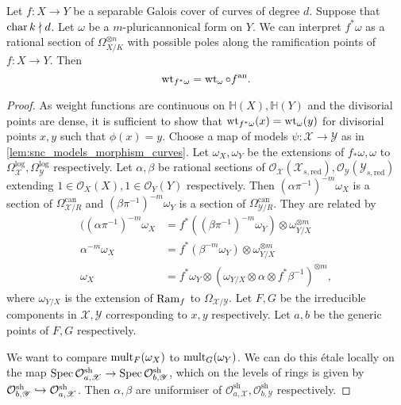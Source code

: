 \begin{theorem}\label{prop:weightfunction_fullback}
	Let $f: X \to Y$ be a separable Galois cover of curves of degree $d$. 
	Suppose that $\operatorname{char} k \nmid d$. 
	Let $\omega $ be a $m$-pluricannonical form on $Y$. 
	We can interpret $f^*\omega$ as a rational section of $\Omega_{X / K}^{\otimes n}$ with possible poles along the ramification points of $f: X \to Y$. 
	Then \[
		\operatorname{wt}_{f^*\omega} = \operatorname{wt}_{\omega} \circ f{}^{\text{an}}
	.\] 
\end{theorem}
\begin{proof}
	As weight functions are continuous on $\mathbb{H}(X), \mathbb{H}(Y)$ and the divisorial points are dense, it is sufficient to show that $\operatorname{wt}_{f^* \omega}(x) = \operatorname{wt}_{\omega}(y)$ 
	for divisorial points  $x, y$ such that $\phi(x) = y$. 
	Choose a map of models $\psi: \mathscr X \to \mathscr Y$ as in \cref{lem:snc_models_morphism_curves}.  
	Let $\omega_X, \omega_Y$ be the extensions of $f_*\omega, \omega$ to $\Omega^{\text{log}}_{\mathscr X}, \Omega^{\text{log}}_{\mathscr Y}$ respectively. 
	Let $\alpha, \beta$ be rational sections of $\mathcal{O}_{\mathscr X}(\mathscr X_{s, \text{red}}), \mathcal{O}_{\mathscr Y}(\mathscr Y_{s, \text{red}} )$ extending $1 \in \mathcal{O}_X(X), 1 \in \mathcal{O}_Y(Y)$ respectively. 
	Then $(\alpha \pi^{-1})^{-m}\omega_{X}$ is a section of $\Omega^{\text{can}}_{\mathscr X / R}$ and $(\beta\pi^{-1})^{-m} \omega_{Y}$ is a section of $\Omega^{\text{can}}_{\mathscr Y / R}$. 
	They are related by \begin{align*}
		((\alpha \pi^{-1})^{-m} \omega_X &= f^*((\beta \pi^{-1})^{-m}\omega_Y) \otimes \omega_{Y / X}^{\otimes m} \\
		\alpha ^{-m} \omega_X &= f^*(\beta ^{-m}\omega_Y) \otimes \omega_{Y / X}^{\otimes m} \\
		\omega_{X} &= f^* \omega_{Y} \otimes (\omega_{Y / X} \otimes \alpha \otimes f^*\beta ^{-1})^{\otimes m}
	,\end{align*} 
	where $\omega_{ Y /  X}$ is the extension of $\operatorname{Ram}_f$ to $\Omega_{\mathscr X / \mathscr Y}$.
	Let $F, G$ be the irreducible components in $\mathscr X, \mathscr Y$ corresponding to $x, y$ respectively. 
	Let $a, b$ be the generic points of $F, G$ respectively. 

	We want to compare $\operatorname{mult}_{F}(\omega_X)$ to $\operatorname{mult}_{G}(\omega_Y)$. 
	We can do this étale locally on the map $\operatorname{Spec} \mathcal{O}_{a, \mathscr X}^{\text{sh}} \to \operatorname{Spec} \mathcal{O}_{b, \mathscr Y}^{\text{sh}}$,
	which on the levels of rings is given by $ \mathcal{O}_{b, \mathscr Y}^{\text{sh}}\hookrightarrow  \mathcal{O}_{a, \mathscr X}^{\text{sh}}$.
	Then $\alpha, \beta$ are uniformiser of $\mathcal{O}_{a, \mathscr X}^{\text{sh}}, \mathcal{O}_{b, \mathscr Y}^{\text{sh}}$ respectively. 


\end{proof}
